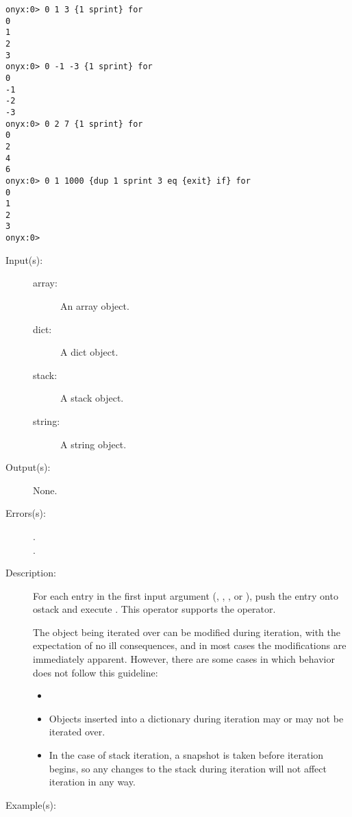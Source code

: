 \begin{description}
\begin{description}
\begin{verbatim}
onyx:0> 0 1 3 {1 sprint} for
0
1
2
3
onyx:0> 0 -1 -3 {1 sprint} for
0
-1
-2
-3
onyx:0> 0 2 7 {1 sprint} for
0
2
4
6
onyx:0> 0 1 1000 {dup 1 sprint 3 eq {exit} if} for
0
1
2
3
onyx:0>
		\end{verbatim}
	\end{description}
\label{systemdict:foreach}
\item[{\onyxop{array proc}{foreach}{--}}: ]
\item[{\onyxop{dict proc}{foreach}{--}}: ]
\item[{\onyxop{stack proc}{foreach}{--}}: ]
\item[{\onyxop{string proc}{foreach}{--}}: ]
	\begin{description}\item[]
	\item[Input(s): ]
		\begin{description}\item[]
		\item[array: ]
			An array object.
		\item[dict: ]
			A dict object.
		\item[stack: ]
			A stack object.
		\item[string: ]
			A string object.
		\end{description}
	\item[Output(s): ] None.
	\item[Errors(s): ]
		\begin{description}\item[]
		\item[.]
		\item[.]
		\end{description}
	\item[Description: ]
		For each entry in the first input argument (,
		, , or ), push the entry
		onto ostack and execute .  This operator supports
		the  operator.

		The object being iterated over can be modified during iteration,
		with the expectation of no ill consequences, and in most cases
		the modifications are immediately apparent.  However, there are
		some cases in which behavior does not follow this guideline:
		\begin{itemize}\item[]
		\item{Objects inserted into a dictionary during iteration may or
			may not be iterated over.}
		\item{In the case of stack iteration, a snapshot is taken before
			iteration begins, so any changes to the stack during
			iteration will not affect iteration in any way.}
		\end{itemize}
	\item[Example(s): ]\begin{verbatim}


\end{verbatim}
\end{description}
\end{description}
